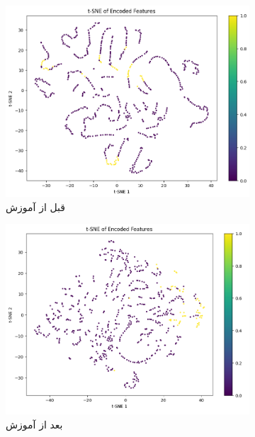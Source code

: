 \begin{figure}[h!]
		\centering %
		\begin{subfigure}{0.33\textwidth}
			\includegraphics[width=\linewidth]{Images/Chapter3/tsne_vanilla.png}
			\caption{قبل از آموزش}
			\label{fig:ch3-tsne-before}
		\end{subfigure}\hfil %
		\begin{subfigure}{0.33\textwidth}
			\includegraphics[width=\linewidth]{Images/Chapter3/tsne.png}
			\caption{بعد از آموزش}
			\label{fig:ch3-tsne-after}
		\end{subfigure}\hfil %
        \begin{subfigure}{0.33\textwidth}

\end{subfigure}
\end{figure}
